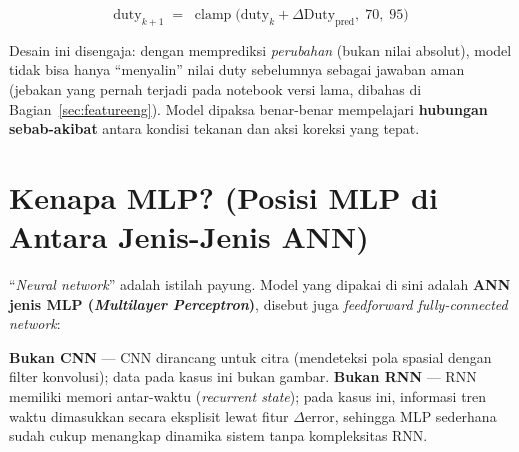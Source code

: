 \documentclass[11pt,a4paper]{article}
\begin{document}
\begin{formulabox}
\[
  \mathrm{duty}_{k+1} \;=\; \operatorname{clamp}\!\big(\mathrm{duty}_k + \Delta\mathrm{Duty}_{\text{pred}},\; 70,\; 95\big)
\]
\end{formulabox}

Desain ini disengaja: dengan memprediksi \emph{perubahan} (bukan nilai absolut), model
tidak bisa hanya ``menyalin'' nilai duty sebelumnya sebagai jawaban aman (jebakan yang
pernah terjadi pada notebook versi lama, dibahas di Bagian~\ref{sec:featureeng}). Model
dipaksa benar-benar mempelajari \textbf{hubungan sebab-akibat} antara kondisi tekanan dan
aksi koreksi yang tepat.

\section{Kenapa MLP? (Posisi MLP di Antara Jenis-Jenis ANN)}

``\emph{Neural network}'' adalah istilah payung. Model yang dipakai di sini adalah
\textbf{ANN jenis MLP (\emph{Multilayer Perceptron})}, disebut juga \emph{feedforward
fully-connected network}:

\begin{center}
\end{center}

\textbf{Bukan CNN} --- CNN dirancang untuk citra (mendeteksi pola spasial dengan filter
konvolusi); data pada kasus ini bukan gambar. \textbf{Bukan RNN} --- RNN memiliki memori
antar-waktu (\emph{recurrent state}); pada kasus ini, informasi tren waktu dimasukkan
secara eksplisit lewat fitur $\Delta\mathrm{error}$, sehingga MLP sederhana sudah cukup
menangkap dinamika sistem tanpa kompleksitas RNN.
\end{document}
